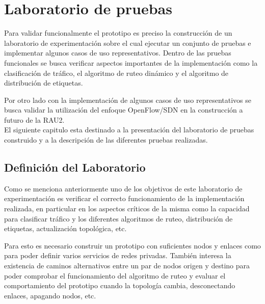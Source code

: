 \chapter{Laboratorio de pruebas}
\label{chapter6}

\ifpdf
    \graphicspath{{Chapter6/Figs/Raster/}{Chapter6/Figs/PDF/}{Chapter6/Figs/}}
\else
    \graphicspath{{Chapter6/Figs/Vector/}{Chapter6/Figs/}}
\fi

Para validar funcionalmente el prototipo es preciso la construcción de un laboratorio de experimentación sobre el cual ejecutar un conjunto de pruebas e implementar algunos casos de uso representativos. Dentro de las pruebas funcionales se busca verificar aspectos importantes de la implementaci\'on como la clasificación de tr\'afico, el algoritmo de ruteo dinámico y el algoritmo de distribución de etiquetas.

Por otro lado con la implementaci\'on de algunos casos de uso representativos se busca validar la utilización del enfoque OpenFlow/SDN en la construcci\'on a futuro de la RAU2.\\

El siguiente capitulo esta destinado a la presentación del laboratorio de pruebas construido y a la descripción de las diferentes pruebas realizadas.

\section{Definición del Laboratorio}

Como se menciona anteriormente uno de los objetivos de este laboratorio de experimentaci\'on es verificar el correcto funcionamiento de la implementaci\'on realizada, en particular en los aspectos críticos de la misma como la capacidad para clasificar tr\'afico y los diferentes algoritmos de ruteo, distribución de etiquetas, actualización topol\'ogica, etc. 

Para esto es necesario construir un prototipo con suficientes nodos y enlaces como para poder definir varios servicios de redes privadas. Tambi\'en interesa la existencia de caminos alternativos entre un par de nodos origen y destino para poder comprobar el funcionamiento del algoritmo de ruteo y evaluar el comportamiento del prototipo cuando la topolog\'ia cambia, desconectando enlaces, apagando nodos, etc.\\

